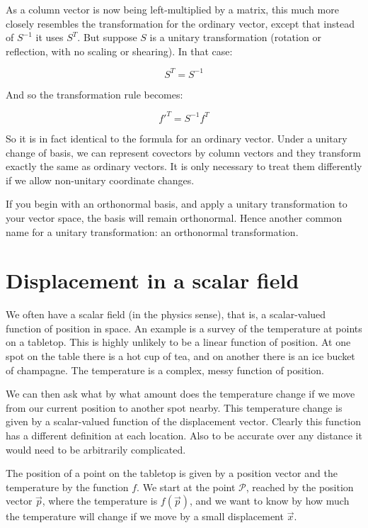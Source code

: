 As a column vector is now being left-multiplied by a matrix, this much more closely resembles the transformation for the ordinary vector, except that instead of $S^{-1}$ it uses $S^T$. But suppose $S$ is a unitary transformation (rotation or reflection, with no scaling or shearing). In that case:

$$
S^T = S^{-1}
$$

And so the transformation rule becomes:

$$
f'^T = S^{-1} f^T 
$$

So it is in fact identical to the formula for an ordinary vector. Under a unitary change of basis, we can represent covectors by column vectors and they transform exactly the same as ordinary vectors. It is only necessary to treat them differently if we allow non-unitary coordinate changes.

If you begin with an orthonormal basis, and apply a unitary transformation to your vector space, the basis will remain orthonormal. Hence another common name for a unitary transformation: an orthonormal transformation.

\section{Displacement in a scalar field}

We often have a scalar field (in the physics sense), that is, a scalar-valued function of position in space. An example is a survey of the temperature at points on a tabletop. This is highly unlikely to be a linear function of position. At one spot on the table there is a hot cup of tea, and on another there is an ice bucket of champagne. The temperature is a complex, messy function of position.

We can then ask what by what amount does the temperature change if we move from our current position to another spot nearby. This temperature change is given by a scalar-valued function of the displacement vector. Clearly this function has a different definition at each location. Also to be accurate over any distance it would need to be arbitrarily complicated.

The position of a point on the tabletop is given by a position vector and the temperature by the function $f$. We start at the point $\mathcal{P}$, reached by the position vector $\vec{p}$, where the temperature is $f(\vec{p})$, and we want to know by how much the temperature will change if we move by a small displacement $\vec{x}$.

